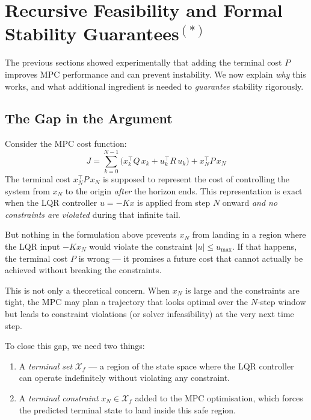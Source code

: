 \section{Recursive Feasibility and Formal Stability Guarantees\texorpdfstring{$^{(*)}$}{(*)}}
\label{sec:mpc_stability_theory}

The previous sections showed experimentally that adding the terminal cost $P$ improves MPC performance and can prevent instability. We now explain \textit{why} this works, and what additional ingredient is needed to \textit{guarantee} stability rigorously.

\subsection{The Gap in the Argument}

Consider the MPC cost function:
\[
J = \sum_{k=0}^{N-1} \bigl(x_k^\top Q\, x_k + u_k^\top R\, u_k\bigr) + x_N^\top P\, x_N
\]
The terminal cost $x_N^\top P\, x_N$ is supposed to represent the cost of controlling the system from $x_N$ to the origin \textit{after} the horizon ends. This representation is exact when the LQR controller $u = -Kx$ is applied from step $N$ onward \emph{and no constraints are violated} during that infinite tail.

But nothing in the formulation above prevents $x_N$ from landing in a region where the LQR input $-Kx_N$ would violate the constraint $|u| \le u_{\max}$. If that happens, the terminal cost $P$ is wrong --- it promises a future cost that cannot actually be achieved without breaking the constraints.

This is not only a theoretical concern. When $x_N$ is large and the constraints are tight, the MPC may plan a trajectory that looks optimal over the $N$-step window but leads to constraint violations (or solver infeasibility) at the very next time step.

To close this gap, we need two things:
\begin{enumerate}
	\item A \emph{terminal set} $\mathcal{X}_f$ --- a region of the state space where the LQR controller can operate indefinitely without violating any constraint.
	\item A \emph{terminal constraint} $x_N \in \mathcal{X}_f$ added to the MPC optimisation, which forces the predicted terminal state to land inside this safe region.
\end{enumerate}

